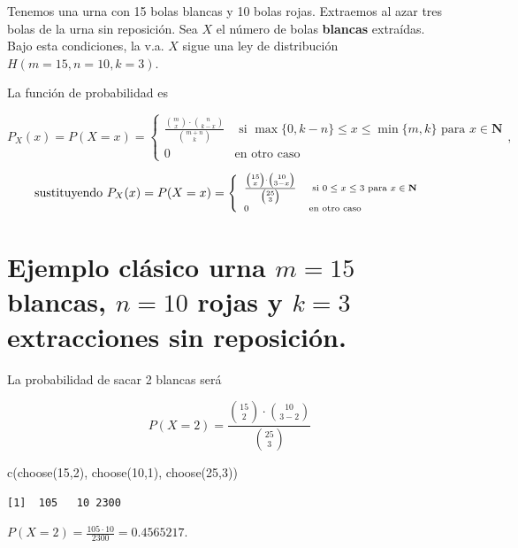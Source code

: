 \documentclass[
  letterpaper,
  DIV=11,
  numbers=noendperiod]{scrreprt}
\newenvironment{Shaded}{\begin{snugshade}}{\end{snugshade}}
\newcommand{\DecValTok}[1]{\textcolor[rgb]{0.68,0.00,0.00}{#1}}
\newcommand{\FunctionTok}[1]{\textcolor[rgb]{0.28,0.35,0.67}{#1}}
\newcommand{\NormalTok}[1]{\textcolor[rgb]{0.00,0.23,0.31}{#1}}
\begin{document}
Tenemos una urna con 15 bolas blancas y 10 bolas rojas. Extraemos al
azar tres bolas de la urna sin reposición. Sea \(X\) el número de bolas
\textbf{blancas} extraídas. Bajo esta condiciones, la v.a. \(X\) sigue
una ley de distribución \(H(m=15,n=10,k=3)\).

La función de probabilidad es

\[
P_X(x)=P(X=x)=\left\{
\begin{array}{ll}
\frac{\binom{m}{x}\cdot \binom{n}{k-x}}{\binom{m+n}{k}} & \mbox{ si }
\max\{0,k-n\}\leq x \leq \min\{m,k\} \mbox { para  } x\in \mathbf{N}\\
0  & \mbox{en otro caso}\end{array}\right.,
\]

\[\mbox{sustituyendo }\scriptsize{
P_X(x)=P(X=x)=\left\{
\begin{array}{ll}
\frac{\binom{15}{x}\cdot \binom{10}{3-x}}{\binom{25}{3}} & \mbox{ si }
0\leq x \leq 3 \mbox { para  } x\in \mathbf{N}\\
0  & \mbox{en otro caso}\end{array}\right.
}\]

\section{\texorpdfstring{Ejemplo clásico urna \(m=15\) blancas, \(n=10\)
rojas y \(k=3\) extracciones sin
reposición.}{Ejemplo clásico urna m=15 blancas, n=10 rojas y k=3 extracciones sin reposición.}}\label{ejemplo-cluxe1sico-urna-m15-blancas-n10-rojas-y-k3-extracciones-sin-reposiciuxf3n.-1}

La probabilidad de sacar 2 blancas será

\[
P(X=2)=\frac{\binom{15}{2}\cdot \binom{10}{3-2}}{\binom{25}{3}}
\]

\begin{Shaded}
\begin{Highlighting}[]
\FunctionTok{c}\NormalTok{(}\FunctionTok{choose}\NormalTok{(}\DecValTok{15}\NormalTok{,}\DecValTok{2}\NormalTok{), }\FunctionTok{choose}\NormalTok{(}\DecValTok{10}\NormalTok{,}\DecValTok{1}\NormalTok{), }\FunctionTok{choose}\NormalTok{(}\DecValTok{25}\NormalTok{,}\DecValTok{3}\NormalTok{))}
\end{Highlighting}
\end{Shaded}

\begin{verbatim}
[1]  105   10 2300
\end{verbatim}

\(P(X=2)=\frac{105\cdot10 }{2300}=0.4565217.\)
\end{document}
